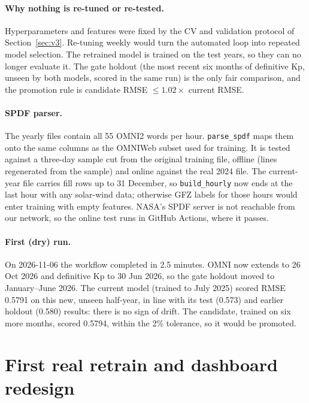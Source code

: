 \documentclass[11pt,a4paper]{article}
\newcommand{\code}[1]{\texttt{#1}}
\begin{document}
\paragraph{Why nothing is re-tuned or re-tested.} Hyperparameters and features were fixed by the CV and validation
protocol of Section~\ref{sec:v3}. Re-tuning weekly would turn the automated loop into repeated model selection.
The retrained model is trained on the test years, so they can no longer evaluate it. The gate holdout (the most
recent six months of definitive Kp, unseen by both models, scored in the same run) is the only fair comparison,
and the promotion rule is candidate RMSE $\le 1.02\times$ current RMSE.

\paragraph{SPDF parser.} The yearly files contain all 55 OMNI2 words per hour. \code{parse\_spdf} maps them onto
the same columns as the OMNIWeb subset used for training. It is tested against a three-day sample cut from the
original training file, offline (lines regenerated from the sample) and online against the real 2024 file. The
current-year file carries fill rows up to 31 December, so \code{build\_hourly} now ends at the last hour with any
solar-wind data; otherwise GFZ labels for those hours would enter training with empty features. NASA's SPDF
server is not reachable from our network, so the online test runs in GitHub Actions, where it passes.

\paragraph{First (dry) run.} On 2026-11-06 the workflow completed in 2.5 minutes. OMNI now extends to 26 Oct
2026 and definitive Kp to 30 Jun 2026, so the gate holdout moved to January--June 2026. The current model (trained
to July 2025) scored RMSE 0.5791 on this new, unseen half-year, in line with its test (0.573) and earlier holdout
(0.580) results: there is no sign of drift. The candidate, trained on six more months, scored 0.5794, within the
2\% tolerance, so it would be promoted.

\section{First real retrain and dashboard redesign}\label{sec:after}
\end{document}

